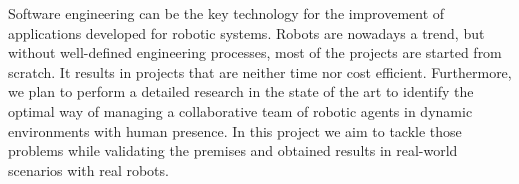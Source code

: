 Software engineering can be the key technology for the improvement of applications developed for robotic systems.
Robots are nowadays a trend, but without well-defined engineering processes, most of the projects are started from scratch.
It results in projects that are neither time nor cost efficient.
Furthermore, we plan to perform a detailed research in the state of the art to identify the optimal way of managing a collaborative team of robotic agents in dynamic environments with human presence.
In this project we aim to tackle those problems while validating the premises and obtained results in real-world scenarios with real robots.



